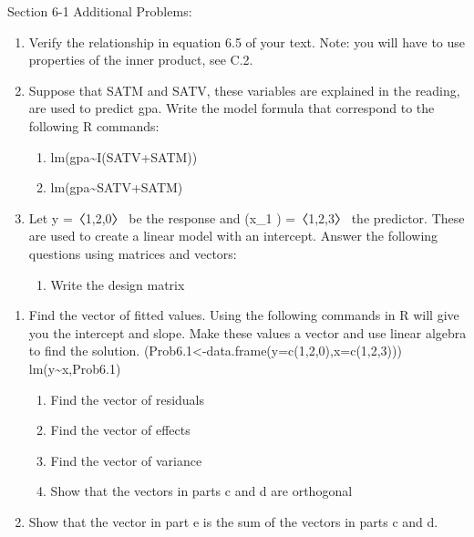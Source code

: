 \documentclass[]{book}
\providecommand{\tightlist}{%
  \setlength{\itemsep}{0pt}\setlength{\parskip}{0pt}}
\theoremstyle{definition}
\theoremstyle{definition}
\theoremstyle{definition}
\theoremstyle{remark}
\begin{document}
Section 6-1 Additional Problems:

\begin{enumerate}
\def\labelenumi{\arabic{enumi}.}
\item
  Verify the relationship in equation 6.5 of your text. Note: you will
  have to use properties of the inner product, see C.2.
\item
  Suppose that SATM and SATV, these variables are explained in the
  reading, are used to predict gpa. Write the model formula that
  correspond to the following R commands:

  \begin{enumerate}
  \def\labelenumii{\alph{enumii})}
  \item
    lm(gpa\textasciitilde{}I(SATV+SATM))
  \item
    lm(gpa\textasciitilde{}SATV+SATM)
  \end{enumerate}
\item
  Let y ⃑=〈1,2,0〉 be the response and (x\_1 ) ⃑=〈1,2,3〉 the
  predictor. These are used to create a linear model with an intercept.
  Answer the following questions using matrices and vectors:

  \begin{enumerate}
  \def\labelenumii{\alph{enumii})}
  \tightlist
  \item
    Write the design matrix
  \end{enumerate}
\end{enumerate}

\begin{enumerate}
\def\labelenumi{\alph{enumi})}
\setcounter{enumi}{1}
\tightlist
\item
  Find the vector of fitted values. Using the following commands in R
  will give you the intercept and slope. Make these values a vector and
  use linear algebra to find the solution.
  (Prob6.1\textless{}-data.frame(y=c(1,2,0),x=c(1,2,3)))
  lm(y\textasciitilde{}x,Prob6.1)

  \begin{enumerate}
  \def\labelenumii{\alph{enumii})}
  \setcounter{enumii}{2}
  \tightlist
  \item
    Find the vector of residuals
  \item
    Find the vector of effects
  \item
    Find the vector of variance
  \item
    Show that the vectors in parts c and d are orthogonal
  \end{enumerate}
\item
  Show that the vector in part e is the sum of the vectors in parts c
  and d.
\end{enumerate}
\end{document}
